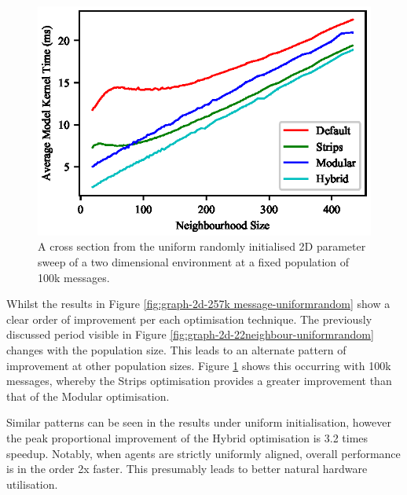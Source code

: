 \begin{figure}[!t]
\centering
\includegraphics[width=\linewidth]{../resources/results/2d/100k_messages.eps}
\caption{\label{fig:graph-2d-100k message-uniformrandom}A cross section from the uniform randomly initialised 2D parameter sweep of a two dimensional environment at a fixed population of 100k messages.}
\end{figure}
      Whilst the results in Figure \ref{fig:graph-2d-257k message-uniformrandom} show a clear order of improvement per each optimisation technique. The previously discussed period visible in Figure \ref{fig:graph-2d-22neighbour-uniformrandom} changes with the population size. This leads to an alternate pattern of improvement at other population sizes. Figure \ref{fig:graph-2d-100k message-uniformrandom} shows this occurring with 100k messages, whereby the Strips optimisation provides a greater improvement than that of the Modular optimisation.

      Similar patterns can be seen in the results under uniform initialisation, however the peak proportional improvement of the Hybrid optimisation is 3.2 times speedup. Notably, when agents are strictly uniformly aligned, overall performance is in the order 2x faster. This presumably leads to better natural hardware utilisation. 
      
